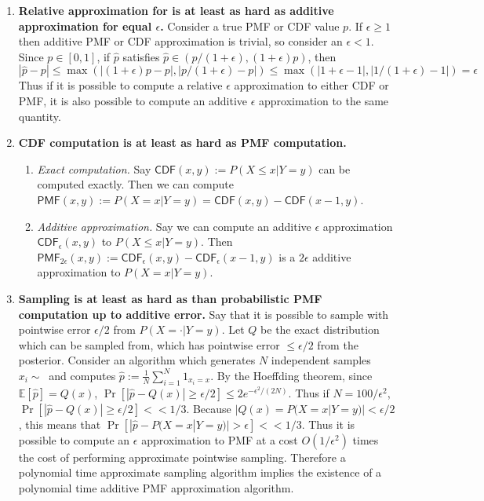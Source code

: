 \documentclass{article}
\theoremstyle{definition}
\theoremstyle{remark}
\begin{document}
\begin{enumerate}
    \item \textbf{Relative approximation for is at least as hard as additive approximation for equal $\epsilon$.}
    Consider a true PMF or CDF value $p$. If $\epsilon \geq 1$ then additive PMF or CDF approximation is trivial, so consider an $\epsilon < 1$.
    Since $p \in [0, 1]$, if $\hat{p}$ satisfies $\hat{p} \in (p/(1+\epsilon), (1+\epsilon)p)$, then $$|\hat{p} - p| \leq \max(|(1 + \epsilon)p - p|, |p/(1+\epsilon) - p|) \leq \max(|1 + \epsilon - 1|, |1/(1+\epsilon) - 1|) = \epsilon$$
    Thus if it is possible to compute a relative $\epsilon$ approximation to either CDF or PMF, it is also possible to compute an additive $\epsilon$ approximation to the same quantity.

    \item \textbf{CDF computation is at least as hard as PMF computation.} 
        \begin{enumerate}
            \item \textit{Exact computation.} Say $\mathsf{CDF}(x, y) := P(X \leq x | Y = y)$ can be computed exactly.  Then we can compute $\mathsf{PMF}(x, y) := P(X = x | Y = y) = \mathsf{CDF}(x, y) - \mathsf{CDF}(x - 1, y)$.
            \item \textit{Additive approximation.} Say we can compute an additive $\epsilon$ approximation $\mathsf{CDF}_\epsilon(x, y)$ to $P(X \leq x | Y = y)$. Then $\mathsf{PMF}_{2\epsilon}(x, y) := \mathsf{CDF}_\epsilon(x, y) - \mathsf{CDF}_\epsilon(x-1, y)$ is a $2\epsilon$ additive approximation to $P(X = x | Y = y)$.
        \end{enumerate}
    \item \textbf{Sampling is at least as hard as than probabilistic PMF computation up to additive error.} Say that it is possible to sample with pointwise error $\epsilon / 2$ from $P(X = \cdot | Y = y)$. Let $Q$ be the exact distribution which can be sampled from, which has pointwise error $\leq \epsilon / 2$ from the posterior.  Consider an algorithm which generates $N$ independent samples $x_i \sim ~$ and computes $\hat{p} := \frac{1}{N} \sum_{i=1}^N 1_{x_i = x}$.
    By the Hoeffding theorem, since $\mathbb{E}[\hat{p}] = Q(x)$, $\Pr[|\hat{p} - Q(x)| \geq \epsilon / 2] \leq 2e^{-\epsilon^2/(2N)}$. Thus if $N = 100/\epsilon^2$, $\Pr[|\hat{p} - Q(x)| \geq \epsilon / 2] << 1/3$.
    Because $|Q(x) = P(X = x | Y = y)| < \epsilon/2$, this means that
    $\Pr[|\hat{p} - P(X = x | Y = y)| > \epsilon] << 1/3$.
    Thus it is possible to compute an $\epsilon$ approximation to PMF at a cost $O(1/\epsilon^2)$ times the cost of performing approximate pointwise sampling.
    Therefore a polynomial time approximate sampling algorithm implies the existence of a polynomial time additive PMF approximation algorithm.
\end{enumerate}
\end{document}
